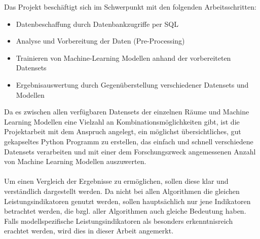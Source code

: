 Das Projekt beschäftigt sich im Schwerpunkt mit den folgenden Arbeitsschritten:
\begin{itemize}
    \item Datenbeschaffung durch Datenbankzugriffe per SQL
    \item Analyse und Vorbereitung der Daten (Pre-Processing)
    \item Trainieren von Machine-Learning Modellen anhand der vorbereiteten Datensets
    \item Ergebnisauswertung durch Gegenüberstellung verschiedener Datensets und Modellen
\end{itemize}
Da es zwischen allen verfügbaren Datensets der einzelnen Räume und Machine Learning Modellen eine Vielzahl an
Kombinationsmöglichkeiten gibt, ist die Projektarbeit mit dem Anspruch angelegt, ein möglichst übersichtliches, 
gut gekapseltes Python Programm zu erstellen, das einfach und schnell verschiedene Datensets  
verarbeiten und mit einer dem Forschungszweck angemessenen Anzahl von Machine Learning Modellen auszuwerten. \\\\
Um einen Vergleich der Ergebnisse zu ermöglichen, sollen diese klar und verständlich dargestellt werden. 
Da nicht bei allen Algorithmen die gleichen Leistungsindikatoren genutzt werden, sollen hauptsächlich nur 
jene Indikatoren betrachtet werden, die bzgl. aller Algorithmen auch gleiche Bedeutung haben. Falls 
modellspezifische Leistungsindikatoren als besonders erkenntnisreich erachtet werden, wird dies in dieser Arbeit
angemerkt.